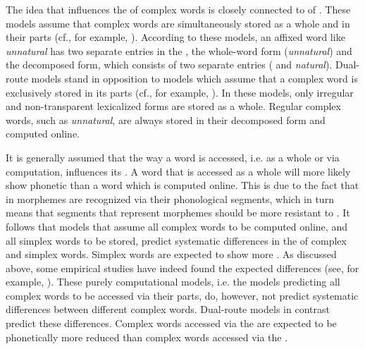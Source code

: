 The idea that  influences the  of complex words is closely connected to  of . These models assume that complex words are simultaneously stored as a whole and in their parts (cf., for example, \citealt{Frauenfelder.1992,Schreuder.2015,deVaan.2011,Caselli.2016}). According to these models, an affixed word like \textit{unnatural} has two separate entries in the , the whole-word form (\textit{unnatural}) and the decomposed form, which consists of two separate entries ( and \textit{natural}). Dual-route models stand in opposition to models which assume that a complex word is exclusively stored in its parts (cf., for example, \citealt{Prasada.1993,Marcus.1995,Clahsen.1999,Pinker.2002}). In these models, only irregular and non-transparent lexicalized forms are stored as a whole. Regular complex words, such as \textit{unnatural}, are always stored in their decomposed form and computed online. 

It is generally assumed that the way a word is accessed, i.e. as a whole or via computation, influences its . A word that is accessed as a whole will more likely show phonetic  than a word which is computed online.  This is due to the fact that in  morphemes are recognized via their phonological segments, which in turn means that segments that represent morphemes should be more resistant to . It follows that models that assume all complex words to be computed online, and all simplex words to be stored, predict systematic differences in the  of complex and simplex words. Simplex words are expected to show more . As discussed above, some empirical studies have indeed found the expected differences (see, for example, \citealt{Cho.2001,Sugahara.2009,Smith.2012}).
These purely computational models, i.e. the models predicting all complex words to be accessed via their parts,  do, however, not predict systematic differences between different complex words. Dual-route models in contrast predict these differences. Complex words accessed via the   are expected to be phonetically more reduced than complex words accessed via the .



